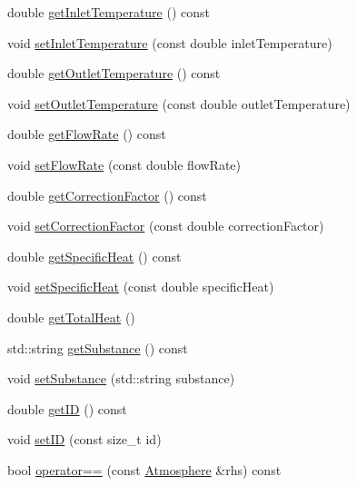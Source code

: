 \begin{DoxyCompactItemize}
\item 
double \hyperlink{class_atmosphere_acb944a3a99cd40f0132713ce73e6ca4a}{get\+Inlet\+Temperature} () const
\item 
void \hyperlink{class_atmosphere_a592bf7f82ea518fbd9da86d8f10cbc5c}{set\+Inlet\+Temperature} (const double inlet\+Temperature)
\item 
double \hyperlink{class_atmosphere_a717e2dc78ebd13420f8f26707374dd3f}{get\+Outlet\+Temperature} () const
\item 
void \hyperlink{class_atmosphere_a8f6589ab4e17d3c531bb7e0e771f4f80}{set\+Outlet\+Temperature} (const double outlet\+Temperature)
\item 
double \hyperlink{class_atmosphere_ad34708b12c8c9af4fce47669d68ebf4d}{get\+Flow\+Rate} () const
\item 
void \hyperlink{class_atmosphere_a9ff0b718c810aec0bb101336db69fd22}{set\+Flow\+Rate} (const double flow\+Rate)
\item 
double \hyperlink{class_atmosphere_a79c94343c7b6659b2f79688a1ba69aed}{get\+Correction\+Factor} () const
\item 
void \hyperlink{class_atmosphere_a86fab4b05de35c9a2b1a3a7e5ab70779}{set\+Correction\+Factor} (const double correction\+Factor)
\item 
double \hyperlink{class_atmosphere_a59802a10861a58ab0f0f4e0ab8671e14}{get\+Specific\+Heat} () const
\item 
void \hyperlink{class_atmosphere_a17450de3bc7a64b2736b1fe8785410cd}{set\+Specific\+Heat} (const double specific\+Heat)
\item 
double \hyperlink{class_atmosphere_ad3dd28020262aee76d374cbfb7998e46}{get\+Total\+Heat} ()
\item 
std\+::string \hyperlink{class_atmosphere_a3ac0fb0d4fc92edc690e44b40b7018c2}{get\+Substance} () const
\item 
void \hyperlink{class_atmosphere_aa92f55a1f07304f3e57fdfb8ece65d82}{set\+Substance} (std\+::string substance)
\item 
double \hyperlink{class_atmosphere_a4dfda799563c28438db1b23cbee6e099}{get\+ID} () const
\item 
void \hyperlink{class_atmosphere_a156e09f05336057be5591146948f6046}{set\+ID} (const size\+\_\+t id)
\item 
\mbox{\label{class_atmosphere_a6bddf411a91af4808f52cd69033a5c54}} 
bool \hyperlink{class_atmosphere_a6bddf411a91af4808f52cd69033a5c54}{operator==} (const \hyperlink{class_atmosphere}{Atmosphere} \&rhs) const

\end{DoxyCompactItemize}
